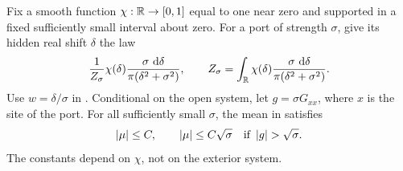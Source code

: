 \begin{lemma}\label{mat:cutoff}
Fix a smooth function $\chi:\mathbb R\to[0,1]$ equal to one near zero and
supported in a fixed sufficiently small interval about zero. For a
port of strength $\sigma$, give its hidden real shift $\delta$ the law
\begin{equation}
 \frac1{Z_\sigma}\chi(\delta)
       \frac{\sigma\,\,\mathrm d\delta}{\pi(\delta^2+\sigma^2)},
 \qquad
 Z_\sigma=\int_\mathbb R\chi(\delta)
       \frac{\sigma\,\,\mathrm d\delta}{\pi(\delta^2+\sigma^2)}.
 \label{mat:cutoff-law}
\end{equation}
Use $w=\delta/\sigma$ in . Conditional on the open
system, let $g=\sigma G_{xx}$, where $x$ is the site of the port. For all
sufficiently small $\sigma$, the mean in
 satisfies
\begin{equation}
 \left\lvert\mu\right\rvert\le C,\qquad
 \left\lvert\mu\right\rvert\le C\sqrt\sigma\quad\hbox{if }\left\lvert g\right\rvert>\sqrt\sigma.
 \label{mat:cutoff-estimate}
\end{equation}
The constants depend on $\chi$, not on the exterior system.
\end{lemma}


